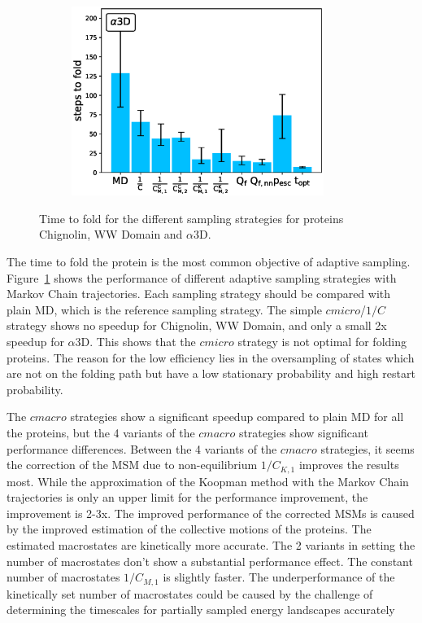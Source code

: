\begin{figure}[H]
\begin{subfigure}[t]{0.5\textwidth}
    \includegraphics[width=0.9\textwidth]{figures/A3D_7_steps10000_nparallel100_fold.eps}   
  \end{subfigure}
  \caption{Time to fold for the different sampling strategies for proteins Chignolin, WW Domain and $\alpha$3D.}
  \label{fig:Time_fold}
\end{figure}


The time to fold the protein is the most common objective of adaptive sampling. Figure~\ref{fig:Time_fold} shows the performance of different adaptive sampling strategies with Markov Chain trajectories.
Each sampling strategy should be compared with plain MD, which is the reference sampling strategy.
The simple $cmicro$/$1/C$ strategy shows no speedup for Chignolin, WW Domain, and only a small 2x speedup for $\alpha$3D. This shows that the $cmicro$ strategy is not optimal for folding proteins. The reason for the low efficiency lies in the oversampling of states which are not on the folding path but have a low stationary probability and high restart probability.

The $cmacro$ strategies show a significant speedup compared to plain MD for all the proteins, but the 4 variants of the $cmacro$ strategies show significant performance differences.
Between the 4 variants of the $cmacro$ strategies, it seems the correction of the MSM due to non-equilibrium  $1/C_{K, 1}$ improves the results most. While the approximation of the Koopman method with the Markov Chain trajectories is only an upper limit for the performance improvement, the improvement is 2-3x. The improved performance of the corrected MSMs is caused by the improved estimation of the collective motions of the proteins. The estimated macrostates are kinetically more accurate. The 2 variants in setting the number of macrostates don't show a substantial performance effect. The constant number
of macrostates $1/C_{M, 1}$ is slightly faster. The underperformance of the kinetically set number of macrostates could be caused by the challenge of determining the timescales for partially sampled energy landscapes accurately

